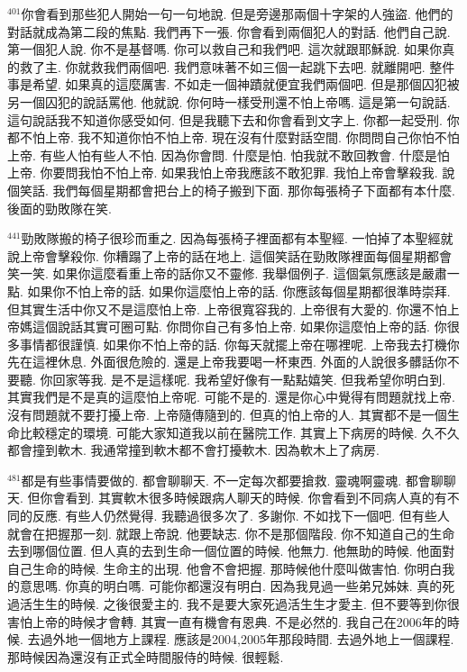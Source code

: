 \documentclass{book}
\begin{document}
$^{401}$你會看到那些犯人開始一句一句地說.
但是旁邊那兩個十字架的人強盜.
他們的對話就成為第二段的焦點.
我們再下一張.
你會看到兩個犯人的對話.
他們自己說.
第一個犯人說.
你不是基督嗎.
你可以救自己和我們吧.
這次就跟耶穌說.
如果你真的救了主.
你就救我們兩個吧.
我們意味著不如三個一起跳下去吧.
就離開吧.
整件事是希望.
如果真的這麼厲害.
不如走一個神蹟就便宜我們兩個吧.
但是那個囚犯被另一個囚犯的說話罵他.
他就說.
你何時一樣受刑還不怕上帝嗎.
這是第一句說話.
這句說話我不知道你感受如何.
但是我聽下去和你會看到文字上.
你都一起受刑.
你都不怕上帝.
我不知道你怕不怕上帝.
現在沒有什麼對話空間.
你問問自己你怕不怕上帝.
有些人怕有些人不怕.
因為你會問.
什麼是怕.
怕我就不敢回教會.
什麼是怕上帝.
你要問我怕不怕上帝.
如果我怕上帝我應該不敢犯罪.
我怕上帝會擊殺我.
說個笑話.
我們每個星期都會把台上的椅子搬到下面.
那你每張椅子下面都有本什麼.
後面的勁敗隊在笑.

$^{441}$勁敗隊搬的椅子很珍而重之.
因為每張椅子裡面都有本聖經.
一怕掉了本聖經就說上帝會擊殺你.
你糟蹋了上帝的話在地上.
這個笑話在勁敗隊裡面每個星期都會笑一笑.
如果你這麼看重上帝的話你又不靈修.
我舉個例子.
這個氣氛應該是嚴肅一點.
如果你不怕上帝的話.
如果你這麼怕上帝的話.
你應該每個星期都很準時崇拜.
但其實生活中你又不是這麼怕上帝.
上帝很寬容我的.
上帝很有大愛的.
你還不怕上帝媽這個說話其實可圈可點.
你問你自己有多怕上帝.
如果你這麼怕上帝的話.
你很多事情都很謹慎.
如果你不怕上帝的話.
你每天就擺上帝在哪裡呢.
上帝我去打機你先在這裡休息.
外面很危險的.
還是上帝我要喝一杯東西.
外面的人說很多髒話你不要聽.
你回家等我.
是不是這樣呢.
我希望好像有一點點嬉笑.
但我希望你明白到.
其實我們是不是真的這麼怕上帝呢.
可能不是的.
還是你心中覺得有問題就找上帝.
沒有問題就不要打擾上帝.
上帝隨傳隨到的.
但真的怕上帝的人.
其實都不是一個生命比較穩定的環境.
可能大家知道我以前在醫院工作.
其實上下病房的時候.
久不久都會撞到軟木.
我通常撞到軟木都不會打擾軟木.
因為軟木上了病房.

$^{481}$都是有些事情要做的.
都會聊聊天.
不一定每次都要搶救.
靈魂啊靈魂.
都會聊聊天.
但你會看到.
其實軟木很多時候跟病人聊天的時候.
你會看到不同病人真的有不同的反應.
有些人仍然覺得.
我聽過很多次了.
多謝你.
不如找下一個吧.
但有些人就會在把握那一刻.
就跟上帝說.
他要缺志.
你不是那個階段.
你不知道自己的生命去到哪個位置.
但人真的去到生命一個位置的時候.
他無力.
他無助的時候.
他面對自己生命的時候.
生命主的出現.
他會不會把握.
那時候他什麼叫做害怕.
你明白我的意思嗎.
你真的明白嗎.
可能你都還沒有明白.
因為我見過一些弟兄姊妹.
真的死過活生生的時候.
之後很愛主的.
我不是要大家死過活生生才愛主.
但不要等到你很害怕上帝的時候才會轉.
其實一直有機會有恩典.
不是必然的.
我自己在2006年的時候.
去過外地一個地方上課程.
應該是2004,2005年那段時間.
去過外地上一個課程.
那時候因為還沒有正式全時間服侍的時候.
很輕鬆.
\end{document}
